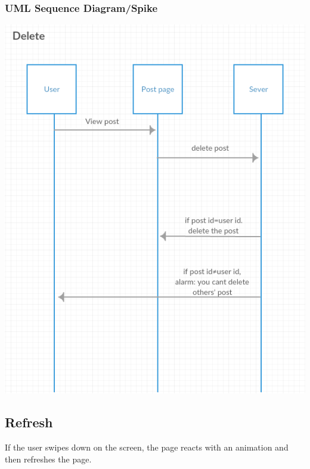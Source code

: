 \documentclass[12pt]{article}
\begin{document}
\subsubsection{UML Sequence Diagram/Spike}
\includegraphics[scale=0.5]{img/5.png}\linebreak

\subsection{Refresh}
If the user swipes down on the screen, the page reacts with an animation and
then refreshes the page.
\end{document}
